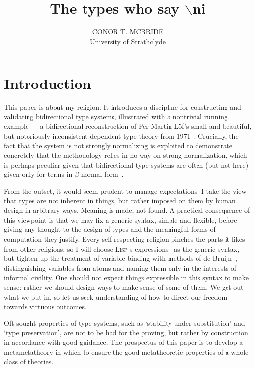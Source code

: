 \documentclass{jfp1}
\begin{document}
\title[Journal of Functional Programming]{The types who say $\backslash$ni}
\author[C. T. McBride]{CONOR T. MCBRIDE\\
  University of Strathclyde\\
  }
\maketitle

\section{Introduction}

This paper is about my religion. It introduces a discipline for
constructing and validating bidirectional type systems, illustrated
with a nontrivial running example --- a bidirectional reconstruction
of Per Martin-L\"of's small and beautiful, but notoriously
inconsistent dependent type theory from
1971~\cite{martinloef:atheoryoftypes}. Crucially, the fact that the
system is not strongly normalizing is exploited to demonstrate
concretely that the methodology relies in no way on strong
normalization, which is perhaps peculiar given that bidirectional type
systems are often (but not here) given only for terms in
$\beta$-normal form~\cite{DBLP:journals/toplas/PierceT00}.

From the outset, it would seem prudent to manage expectations. I take
the view that types are not inherent in things, but rather imposed on
them by human design in arbitrary ways. Meaning is made, not
found. A practical consequence of this viewpoint is that we may
fix a generic syntax, simple and flexible, before giving any thought
to the design of types and the meaningful forms of computation they
justify. Every self-respecting religion pinches the parts it likes
from other religions, so I will choose \textsc{Lisp} s-expressions~\cite{MCCARTHY60}
as the generic syntax, but tighten up the treatment of variable
binding with methods of de Bruijn~\cite{deBruijn:dummies},
distinguishing variables from atoms and naming them only in the
interests of informal civility. One should not expect things
expressible in this syntax to make sense: rather we should design
ways to make sense of some of them. We get out what we put
in, so let us seek understanding of how to direct our freedom towards virtuous
outcomes.

Oft sought properties of type systems, such as `stability under
substitution' and `type preservation', are not to be had for the
proving, but rather by construction in accordance with good guidance.
The prospectus of this paper is to develop a metametatheory in which
to ensure the good metatheoretic properties of a whole class of theories.
\end{document}
